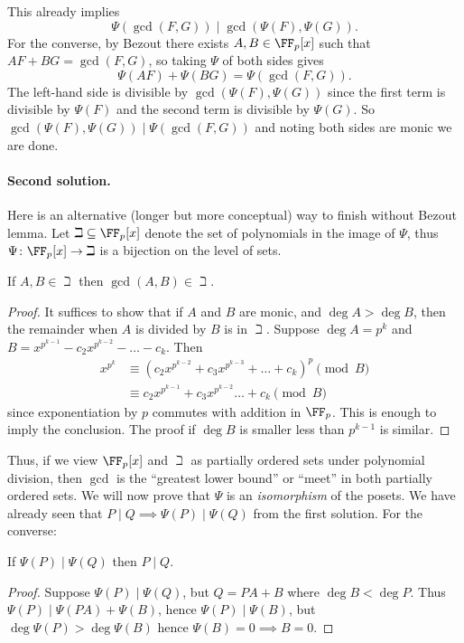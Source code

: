 \documentclass[11pt]{scrartcl}
\begin{document}
This already implies
\[ \Psi(\gcd(F,G)) \mid \gcd(\Psi(F), \Psi(G)). \]
For the converse, by Bezout there exists $A,B \in \FF_p[x]$
such that $AF + BG = \gcd(F,G)$, so taking $\Psi$ of both sides gives
\[ \Psi(AF) + \Psi(BG) = \Psi\left( \gcd(F,G) \right). \]
The left-hand side is divisible by $\gcd(\Psi(F), \Psi(G))$
since the first term is divisible by $\Psi(F)$
and the second term is divisible by $\Psi(G)$.
So $\gcd(\Psi(F), \Psi(G)) \mid \Psi(\gcd(F,G))$
and noting both sides are monic we are done.


\paragraph{Second solution.}
Here is an alternative (longer but more conceptual)
way to finish without Bezout lemma.
Let $\beth \subseteq \FF_p[x]$ denote the set of polynomials
in the image of $\Psi$,
thus $\Psi \colon \FF_p[x] \to \beth$ is a bijection on the level of sets.

\begin{claim*}
  If $A,B \in \beth$ then $\gcd(A,B) \in \beth$.
\end{claim*}
\begin{proof}
  It suffices to show that if $A$ and $B$ are monic,
  and $\deg A > \deg B$,
  then the remainder when $A$ is divided by $B$ is in $\beth$.
  Suppose $\deg A = p^k$ and $B = x^{p^{k-1}} - c_2x^{p^{k-2}} - \dots - c_k$.
  Then
  \begin{align*}
    x^{p^k} &\equiv \left( c_2x^{p^{k-2}} + c_3x^{p^{k-3}}
    + \dots + c_k  \right)^p \pmod B  \\
    &\equiv c_2x^{p^{k-1}} + c_3x^{p^{k-2}} \dots + c_k \pmod B
  \end{align*}
  since exponentiation by $p$ commutes with addition in $\FF_p$.
  This is enough to imply the conclusion.
  The proof if $\deg B$ is smaller less than $p^{k-1}$ is similar.
\end{proof}

Thus, if we view $\FF_p[x]$ and $\beth$ as partially ordered sets
under polynomial division, then $\gcd$ is the
``greatest lower bound'' or ``meet'' in both partially ordered sets.
We will now prove that $\Psi$ is an \emph{isomorphism} of the posets.
We have already seen that $P \mid Q \implies \Psi(P) \mid \Psi(Q)$
from the first solution. For the converse:

\begin{claim*}
  If $\Psi(P) \mid \Psi(Q)$ then $P \mid Q$.
\end{claim*}
\begin{proof}
  Suppose $\Psi(P) \mid \Psi(Q)$, but $Q=PA+B$ where $\deg B < \deg P$.
  Thus $\Psi(P) \mid \Psi(PA) + \Psi(B)$, hence $\Psi(P) \mid \Psi(B)$,
  but $\deg \Psi(P) > \deg \Psi(B)$ hence $\Psi(B) = 0 \implies B = 0$.
\end{proof}
\end{document}
